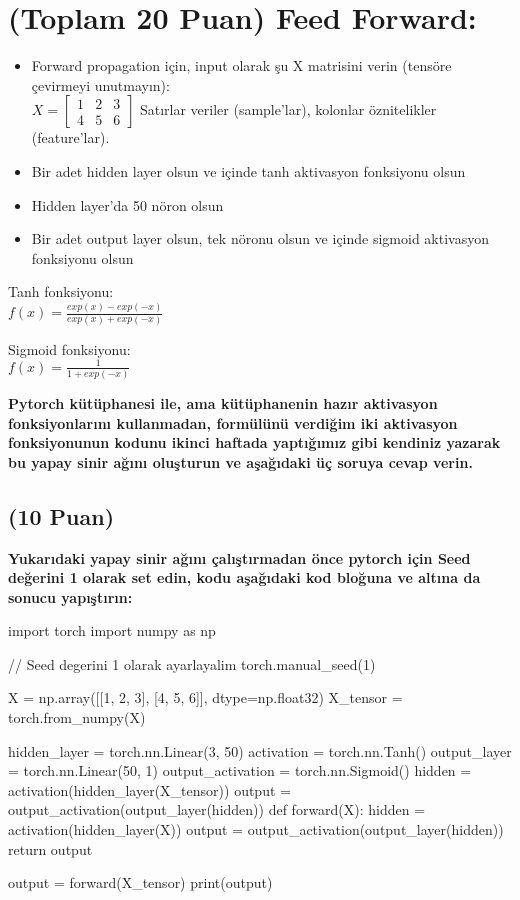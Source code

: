 \documentclass[11pt]{article}
\begin{document}
\section{(Toplam 20 Puan) Feed Forward:}
 
\begin{itemize}
    \item Forward propagation için, input olarak şu X matrisini verin (tensöre çevirmeyi unutmayın):\\
    $X = \begin{bmatrix}
        1 & 2 & 3\\
        4 & 5 & 6
        \end{bmatrix}$
    Satırlar veriler (sample'lar), kolonlar öznitelikler (feature'lar).
    \item Bir adet hidden layer olsun ve içinde tanh aktivasyon fonksiyonu olsun
    \item Hidden layer'da 50 nöron olsun
    \item Bir adet output layer olsun, tek nöronu olsun ve içinde sigmoid aktivasyon fonksiyonu olsun
\end{itemize}

Tanh fonksiyonu:\\
$f(x) = \frac{exp(x) - exp(-x)}{exp(x) + exp(-x)}$
\vspace{.2in}

Sigmoid fonksiyonu:\\
$f(x) = \frac{1}{1 + exp(-x)}$

\vspace{.2in}
 \textbf{Pytorch kütüphanesi ile, ama kütüphanenin hazır aktivasyon fonksiyonlarını kullanmadan, formülünü verdiğim iki aktivasyon fonksiyonunun kodunu ikinci haftada yaptığımız gibi kendiniz yazarak bu yapay sinir ağını oluşturun ve aşağıdaki üç soruya cevap verin.}
 
\subsection{(10 Puan)} \textbf{Yukarıdaki yapay sinir ağını çalıştırmadan önce pytorch için Seed değerini 1 olarak set edin, kodu aşağıdaki kod bloğuna ve altına da sonucu yapıştırın:}

\begin{python}
import torch
import numpy as np

 // Seed degerini 1 olarak ayarlayalim
torch.manual_seed(1)

X = np.array([[1, 2, 3], [4, 5, 6]], dtype=np.float32)
X_tensor = torch.from_numpy(X)

hidden_layer = torch.nn.Linear(3, 50)
activation = torch.nn.Tanh()
output_layer = torch.nn.Linear(50, 1)
output_activation = torch.nn.Sigmoid()
hidden = activation(hidden_layer(X_tensor))
output = output_activation(output_layer(hidden))
def forward(X):
    hidden = activation(hidden_layer(X))
    output = output_activation(output_layer(hidden))
    return output

output = forward(X_tensor)
print(output)



\end{python}
\end{document}
